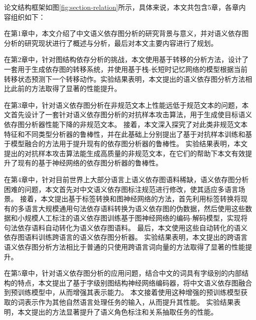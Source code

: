 论文结构框架如图\ref{fig:section-relation}所示，具体来说，本文共包含5章，各章内容组织如下：

在第1章中，本文介绍了中文语义依存图分析的研究背景与意义，并对语义依存图分析的研究现状进行了概述与分析，最后对本文主要内容进行了规划。

在第2章中，针对图结构依存分析的挑战，本文使用基于转移的分析方法，设计了一套用于生成依存图的转移系统，并使用基于栈-长短时记忆网络的模型根据当前转移状态预测下一个转移动作。实验结果表明，本文提出的语义依存图分析方法相比此前的方法取得了显著的性能提升。

在第3章中，针对语义依存图分析在非规范文本上性能远低于规范文本的问题，本文首先设计了一套针对语义依存图分析的对抗样本攻击算法，用于生成使目标语义依存图分析器性能下降的非规范文本。
接着，本文深入探究了对此类非规范文本特征和不同类型分析器的鲁棒性，并在此基础上分别提出了基于对抗样本训练和基于模型融合的方法用于提升现有的依存图分析器的鲁棒性。
实验结果表明，本文提出的对抗样本攻击算法能生成高质量的非规范文本，在它们的帮助下本文有效提升了现有的基于神经网络的依存图分析器的鲁棒性。

在第4章中，针对目前世界上大部分语言上语义依存图语料稀缺，语义依存图分析困难的问题，本文首先对中文语义依存图标注规范进行修改，使其适应多语言场景。
接着，本文提出基于标签转换和图神经网络的方法，首先利用标签转换将现有的多语言大规模通用句法依存语料转换为语义依存图的伪数据，然后使用这些数据和小规模人工标注的语义依存图训练基于图神经网络的编码-解码模型，实现将句法依存语料自动转化为语义依存图语料。
最后，本文使用这些自动转化的语义依存图语料训练跨语言的语义依存图分析器。
实验结果表明，本文提出的跨语言语义依存图分析方法相比于普通的只使用跨语言词向量的方法取得了显著的性能提升。

在第5章中，针对语义依存图分析的应用问题，结合中文的词具有字级别的内部结构的特点，本文提出了基于字级别图结构神经网络编码器，将中文语义依存图融合到预训练模型中，从而增强其表示能力。
本文接着使用这种增强的预训练模型获取的词表示作为其他自然语言处理任务的输入，从而提升其性能。
实验结果表明，本文提出的方法显著提升了语义角色标注和关系抽取任务的性能。

